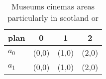 \documentclass[a4paper]{article}
\begin{document}
\begin{table}
\begin{adjustbox}{width=0.6\columnwidth}
\begin{tabular}{|l|l|l|l|}
\hline
\textbf{plan} & \multicolumn{1}{c|}{\textbf{0}} & \multicolumn{1}{c|}{\textbf{1}} & \multicolumn{1}{c|}{\textbf{2}} \\ \hline
\textbf{$a_0$}  & (0,0) & (1,0) & (2,0) \\ \hline
\textbf{$a_1$}  & (0,0) & (1,0) & (2,0) \\ \hline
\end{tabular}
\end{adjustbox}
\caption{Museums cinemas areas particularly in scotland or
}
\end{table}
\end{document}
